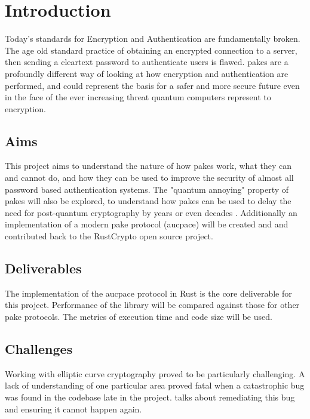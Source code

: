 \chapter{Introduction}
\label{chap:intro}

Today's standards for Encryption and Authentication are fundamentally broken.
The age old standard practice of obtaining an encrypted connection to a server, then sending a cleartext password to authenticate users is flawed.
\glspl{pake} are a profoundly different way of looking at how encryption and authentication are performed, and could represent the basis for a safer and more secure future even in the face of the ever increasing threat quantum computers represent to encryption.

\section{Aims}
This project aims to understand the nature of how \glspl{pake} work, what they can and cannot do, and how they can be used to improve the security of almost all password based authentication systems.
The "quantum annoying" property of \glspl{pake} will also be explored, to understand how \glspl{pake} can be used to delay the need for post-quantum cryptography by years or even decades \cite{quantum-annoying}.
Additionally an implementation of a modern \gls{pake} protocol (\gls{aucpace}) will be created and and contributed back to the RustCrypto open source project.

\section{Deliverables}
The implementation of the \gls{aucpace} protocol in Rust is the core deliverable for this project.
Performance of the library will be compared against those for other \gls{pake} protocols.
The metrics of execution time and code size will be used.

\section{Challenges}
Working with elliptic curve cryptography proved to be particularly challenging.
A lack of understanding of one particular area proved fatal when a catastrophic bug was found in the codebase late in the project.
 talks about remediating this bug and ensuring it cannot happen again.

